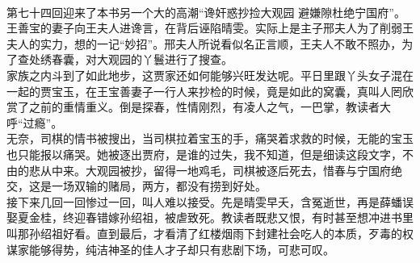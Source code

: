 %
\begin{solution}
    \

    \large 第七十四回迎来了本书另一个大的高潮“谗奸惑抄捡大观园 避嫌隙杜绝宁国府”。王善宝的妻子向王夫人进谗言，在背后诬陷晴雯。实际上是主子邢夫人为了削弱王夫人的实力，想的一记“妙招”。邢夫人所说看似名正言顺，王夫人不敢不照办，为了查处绣春囊，对大观园的丫鬟进行了搜查。\\
    家族之内斗到了如此地步，这贾家还如何能够兴旺发达呢。平日里跟丫头女子混在一起的贾宝玉，在王宝善妻子一行人来抄检的时候，竟是如此的窝囊，真叫人罔欣赏了之前的重情重义。倒是探春，性情刚烈，有凌人之气，一巴掌，教读者大呼“过瘾”。\\
    无奈，司棋的情书被搜出，当司棋拉着宝玉的手，痛哭着求救的时候，无能的宝玉也只能报以痛哭。她被逐出贾府，是谁的过失，我不知道，但是细读这段文字，不由的悲从中来。大观园被抄，留得一地鸡毛，司棋被逐后死去，惜春与宁国府绝交，这是一场双输的赌局，两方，都没有捞到好处。\\
    接下来几回一回惨过一回，叫人难以接受。先是晴雯早夭，含冤逝世，再是薛蟠误娶夏金桂，终迎春错嫁孙绍祖，被虐致死。教读者既悲又恨，有时甚至想冲进书里叫那孙绍祖好看。直到最后，才看清了红楼烟雨下封建社会吃人的本质，歹毒的权谋家能够得势，纯洁神圣的佳人才子却只有悲剧下场，可悲可叹。
\end{solution}


%



%



%


